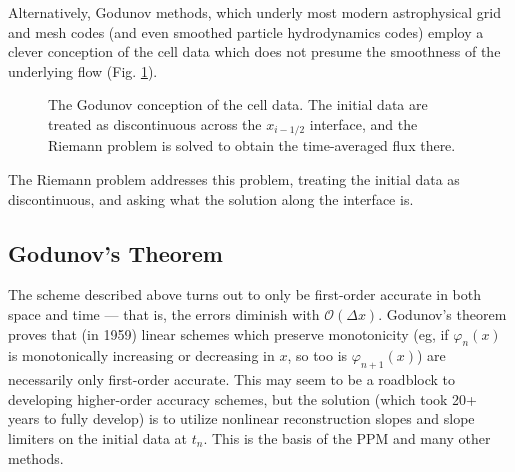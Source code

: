 \documentclass[notoc]{tufte-handout}
\begin{document}
Alternatively, Godunov methods, which underly most modern astrophysical grid and mesh codes (and even smoothed particle hydrodynamics codes) employ a clever conception of the cell data which does not presume the smoothness of the underlying flow (Fig. \ref{fig:godunov}).

\begin{figure}[htbp]
\centering
{}
\caption{The Godunov conception of the cell data. The initial data are treated as discontinuous across the $x_{i-1/2}$ interface, and the Riemann problem is solved to obtain the time-averaged flux there.}
\label{fig:godunov}
\end{figure}

The Riemann problem addresses this problem, treating the initial data as discontinuous, and asking what the solution along the interface is.

\subsection{Godunov's Theorem}

The scheme described above turns out to only be first-order accurate in both space and time --- that is, the errors diminish with $\mathcal{O}(\Delta x)$. Godunov's theorem proves that (in 1959) linear schemes which preserve monotonicity (eg, if $\varphi_n(x)$ is monotonically increasing or decreasing in $x$, so too is $\varphi_{n+1}(x)$) are necessarily only first-order accurate. This may seem to be a roadblock to developing higher-order accuracy schemes, but the solution (which took 20+ years to fully develop) is to utilize nonlinear reconstruction slopes and slope limiters on the initial data at $t_n$. This is the basis of the PPM and many other methods.
\end{document}
